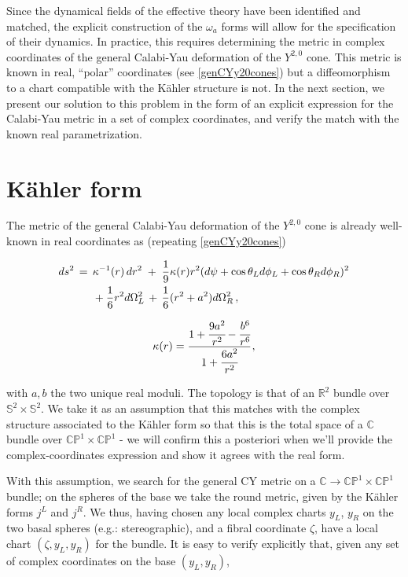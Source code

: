 Since the dynamical fields of the effective theory have been identified and matched, the explicit construction of the $\omega_a$ forms will allow for the specification of their dynamics. In practice, this requires determining the metric in complex coordinates of the general Calabi-Yau deformation of the $Y^{2,0}$ cone. This metric is known in real, ``polar'' coordinates (see \eqref{genCYy20cones}) but a diffeomorphism to a chart compatible with the K\"ahler structure is not. In the next section, we present our solution to this problem in the form of an explicit expression for the Calabi-Yau metric in a set of complex coordinates, and verify the match with the known real parametrization.


\section{K\"ahler form}

The metric of the general Calabi-Yau deformation of the $Y^{2,0}$ cone is already well-known in real coordinates as (repeating \eqref{genCYy20cones})

\begin{align}
\begin{split}
ds^2 \,= \;\, &\kappa^{-1}(r)\,dr^2 \;+\; \frac{1}{9} \kappa(r) r^2 \large(d\psi + \cos\theta_L d\phi_L + \cos\theta_R d\phi_R\large)^2\\
& + \frac{1}{6} r^2 d\Omega_L^2 \,+ \, \frac{1}{6}(r^2+a^2) d\Omega_R^2\,, \label{y20metric} 
\end{split}
\end{align}

\begin{equation}
	\kappa(r) = \cfrac{1 + \cfrac{9a^2}{r^2} - \cfrac{b^6}{r^6}}{1+ \cfrac{6a^2}{r^2}}\,,
\end{equation}

with $a,b$ the two unique real moduli. The topology is that of an $\mathbb{R}^2$ bundle over $\mathbb{S}^2 \times \mathbb{S}^2$. We take it as an assumption that this matches with the complex structure associated to the K\"ahler form so that this is the total space of a $\mathbb{C}$ bundle over $\mathbb{CP}^1 \times \mathbb{CP}^1$ - we will confirm this a posteriori when we'll provide the complex-coordinates expression and show it agrees with the real form.

With this assumption, we search for the general CY metric on a $\mathbb{C} \rightarrow \mathbb{CP}^1 \times \mathbb{CP}^1$ bundle; on the spheres of the base we take the round metric, given by the K\"ahler forms $j^L$ and $j^R$. We thus, having chosen any local complex charts $y_L$, $y_R$ on the two basal spheres (e.g.: stereographic), and a fibral coordinate $\zeta$, have a local chart $(\zeta,y_L,y_R)$ for the bundle. It is easy to verify explicitly that, given any set of complex coordinates on the base $(y_L,y_R)$,

